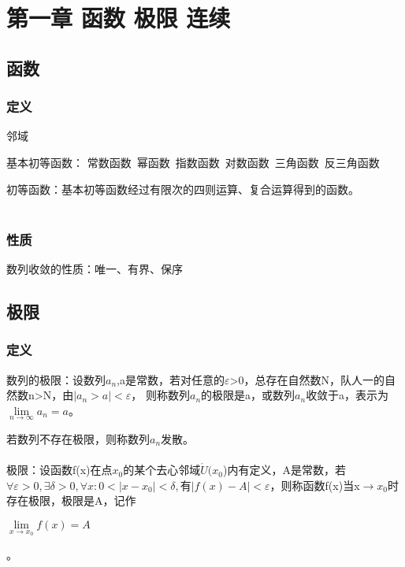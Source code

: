 \documentclass{ctexart}
\begin{document}

\tableofcontents
\newpage


\section{第一章 函数 极限 连续}
\subsection{函数}
\subsubsection{定义}

邻域


基本初等函数：
常数函数\ 幂函数\ 指数函数\ 对数函数\ 三角函数\ 反三角函数

初等函数：基本初等函数经过有限次的四则运算、复合运算得到的函数。
\\\\

\subsubsection{性质}

数列收敛的性质：唯一、有界、保序

\subsection{极限}
\subsubsection{定义}
数列的极限：设数列${a_n}$,a是常数，若对任意的$\varepsilon$>0，总存在自然数N，队人一的自然数n>N，由$|a_n>a|<\varepsilon$，
则称数列${a_n}$的极限是a，或数列${a_n}$收敛于a，表示为$\lim\limits_{n \rightarrow \infty}a_n = a$。

若数列不存在极限，则称数列${a_n}$发散。
\\\\

极限：设函数f(x)在点$x_0$的某个去心邻域$\mathring{U}(x_0$)内有定义，A是常数，若$\forall \varepsilon > 0,\exists \delta >0,\forall x: 0<|x-x_0|<\delta,有|f(x)-A|<\varepsilon$，则称函数f(x)当x$\rightarrow x_0$时存在极限，极限是A，记作
\begin{center}
$\lim\limits_{x \rightarrow x_0} f(x)=A$\\
\end{center}。
\\\\
\end{document}
